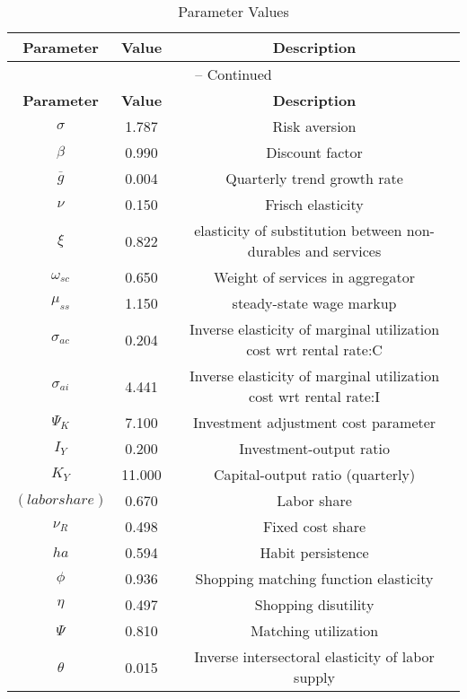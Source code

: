 \begin{center}
\begin{longtable}{ccc}
\caption{Parameter Values}\\%
\toprule%
\multicolumn{1}{c}{\textbf{Parameter}} &
\multicolumn{1}{c}{\textbf{Value}} &
 \multicolumn{1}{c}{\textbf{Description}}\\%
\midrule%
\endfirsthead
\multicolumn{3}{c}{{\tablename} \thetable{} -- Continued}\\%
\midrule%
\multicolumn{1}{c}{\textbf{Parameter}} &
\multicolumn{1}{c}{\textbf{Value}} &
  \multicolumn{1}{c}{\textbf{Description}}\\%
\midrule%
\endhead
${\sigma}$ 	 & 	 1.787 	 & 	 Risk aversion\\
${\beta}$ 	 & 	 0.990 	 & 	 Discount factor\\
${\overline{g}}$ 	 & 	 0.004 	 & 	 Quarterly trend growth rate\\
$\nu$ 	 & 	 0.150 	 & 	 Frisch elasticity\\
$\xi$ 	 & 	 0.822 	 & 	 elasticity of substitution between non-durables and services\\
$\omega_{sc}$ 	 & 	 0.650 	 & 	 Weight of services in aggregator\\
$\mu_{ss}$ 	 & 	 1.150 	 & 	 steady-state wage markup\\
${\sigma_{ac}}$ 	 & 	 0.204 	 & 	 Inverse elasticity of marginal utilization cost wrt rental rate:C\\
${\sigma_{ai}}$ 	 & 	 4.441 	 & 	 Inverse elasticity of marginal utilization cost wrt rental rate:I\\
${\Psi_{K}}$ 	 & 	 7.100 	 & 	 Investment adjustment cost parameter\\
${I_Y}$ 	 & 	 0.200 	 & 	 Investment-output ratio\\
${K_Y}$ 	 & 	 11.000 	 & 	 Capital-output ratio (quarterly)\\
$(labor share)$ 	 & 	 0.670 	 & 	 Labor share\\
${\nu_R}$ 	 & 	 0.498 	 & 	 Fixed cost share\\
${ha}$ 	 & 	 0.594 	 & 	 Habit persistence\\
${\phi}$ 	 & 	 0.936 	 & 	 Shopping matching function elasticity\\
${\eta}$ 	 & 	 0.497 	 & 	 Shopping disutility\\
${\Psi}$ 	 & 	 0.810 	 & 	 Matching utilization\\
${\theta}$ 	 & 	 0.015 	 & 	 Inverse intersectoral elasticity of labor supply\\

\end{longtable}
\end{center}

